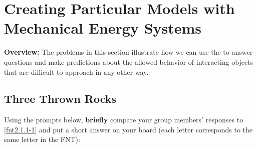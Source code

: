 \section[Particular Models involving Mechanical Energy]{Creating Particular Models with Mechanical Energy Systems}
\label{act2.1.3}

\begin{overview}

\noindent\textbf{Overview:} The problems in this section illustrate how we can use the \EnergyInteractionModel{} to answer questions and make predictions about the allowed behavior of interacting objects that are difficult to approach in any other way.
	
\end{overview}


\subsection{Three Thrown Rocks}
\label{act2.1.3a}

\begin{fnt}
	
\end{fnt}


\noindent Using the prompts below, \textbf{briefly} compare your group members' responses to \ref{fnt2.1.1-1} and put a short answer on your board (each letter corresponds to the same letter in the FNT):

